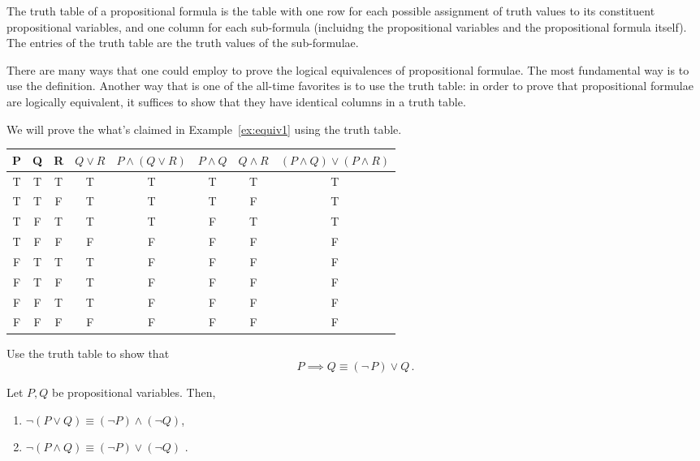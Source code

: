 \begin{definition}
    The truth table of a propositional formula is the table with one row for each 
    possible assignment of truth values to its constituent propositional variables, 
    and one column for each sub-formula 
    (incluidng the propositional variables and the propositional formula itself).
    The entries of the truth table are the truth values of the 
    sub-formulae.
\end{definition}

There are many ways that one could employ to prove the logical equivalences
of propositional formulae. 
The most fundamental way is to use the definition.
Another way that is one of the all-time favorites is to use the truth table: 
in order to prove that propositional formulae are logically equivalent, 
it suffices to show that they have identical columns in a truth table.

\begin{example}
    We will prove the what's claimed in Example~\ref{ex:equiv1} using the truth table. 
\end{example}

\begin{center}
\begin{tabular}{ |c|c|c|c|c||c|c|c| } 
\hline
P & Q & R & $Q \vee R$ & $P \wedge (Q \vee R)$ & $P \wedge Q$ & $Q \wedge R$ & $(P\wedge Q) \vee (P \wedge R)$ \\
\hline
T& T & T &T & T & T & T & T\\ 
T& T & F & T & T & T & F & T\\ 
T& F & T & T & T & F & T & T\\ 
T & F & F & F & F &F & F &F \\
F & T& T & T & F&F & F &F\\
F & T& F & T & F&F & F &F\\
F & F& T &T & F&F & F &F\\
F & F& F & F & F&F & F &F\\ 
\hline
\end{tabular}
\end{center}

\begin{example}
   Use the truth table to show that
   \begin{equation*}
       P \implies Q \equiv (\neg\, P) \vee Q\,.
   \end{equation*}
\end{example}

\begin{theorem}
   Let $P, Q$ be propositional variables. Then,
   \begin{enumerate}
       \item $\neg (P \vee Q) \equiv (\neg P) \wedge (\neg Q) $,
       \item $\neg (P \wedge Q) \equiv (\neg P) \vee (\neg Q) $ .
   \end{enumerate}
\end{theorem}

